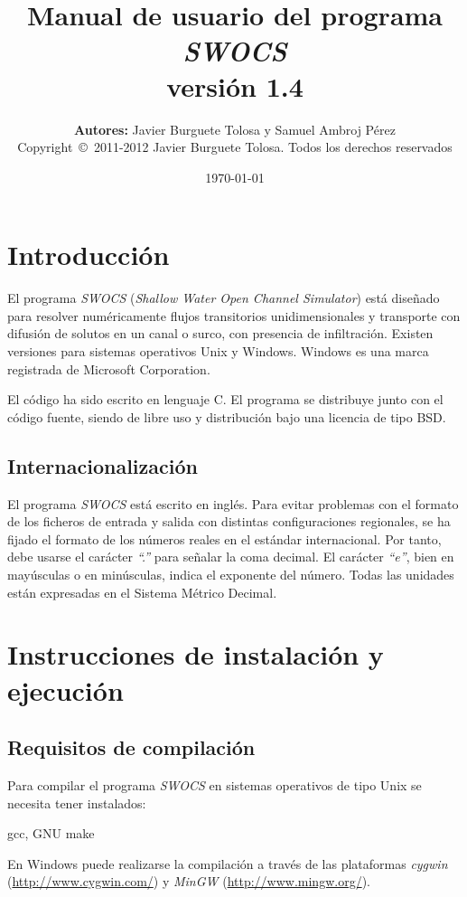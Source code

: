\documentclass[a4paper,12pt]{report}
\title
{
	{\bf \Large Manual de usuario del programa \emph{SWOCS}}\\
	{\large	versión 1.4}
}
\author
{
	{\bf Autores:} Javier Burguete Tolosa y Samuel Ambroj Pérez\\
	{\small Copyright~\copyright~2011-2012 Javier Burguete Tolosa.
	Todos los derechos reservados}
}
\date{\today}
\newcommand{\swocs}{\emph{SWOCS}}
\newcommand{\IT}[1]{{\sl ``#1''}}
\begin{document}
\maketitle

\tableofcontents

\setlength{\parskip}{\baselineskip / 2}

\chapter{Introducción}

El programa {\swocs} ({\it Shallow Water Open Channel Simulator}) está diseñado
para resolver numéricamente flujos transitorios unidimensionales y transporte
con difusión de solutos en un canal o surco, con presencia de infiltración.
Existen versiones para sistemas operativos Unix y Windows. Windows es una marca
registrada de Microsoft Corporation.

El código ha sido escrito en lenguaje C. El programa se distribuye junto con el
código fuente, siendo de libre uso y distribución bajo una licencia de tipo BSD.  
\section{Internacionalización}

El programa {\swocs} está escrito en inglés. Para evitar problemas con
el formato de los ficheros de entrada y salida con distintas configuraciones
regionales, se ha fijado el formato de los números reales en el estándar
internacional. Por tanto, debe usarse el carácter \IT{.} para señalar la coma
decimal. El carácter \IT{e}, bien en mayúsculas o en minúsculas, indica el
exponente del número. Todas las unidades están expresadas en el Sistema
Métrico Decimal.

\chapter{Instrucciones de instalación y ejecución}

\section{Requisitos de compilación}
Para compilar el programa {\swocs} en sistemas operativos de tipo Unix se
necesita tener instalados:
\begin{verbatimtab}
	gcc, GNU make
\end{verbatimtab}
En Windows puede realizarse la compilación a través de las plataformas
\emph{cygwin} (\url{http://www.cygwin.com/}) y \emph{MinGW}
(\url{http://www.mingw.org/}). 
\end{document}
